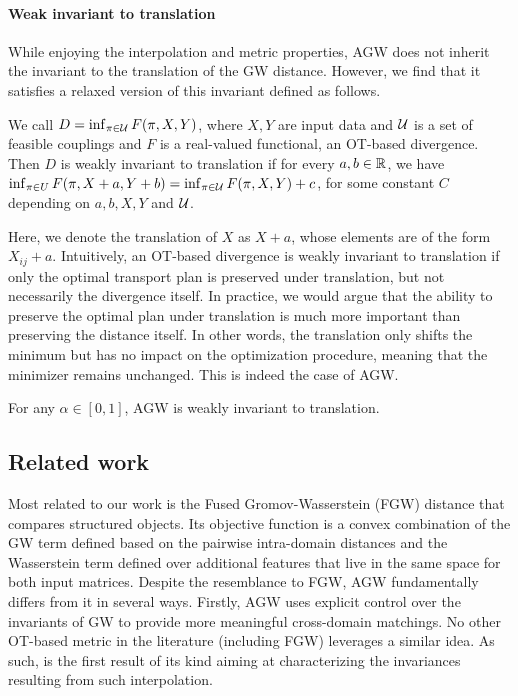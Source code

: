 \paragraph{Weak invariant to translation}
While enjoying the interpolation and metric properties, AGW does not inherit the invariant
to the translation of the GW distance. However, we find that it satisfies a relaxed version
of this invariant defined as follows.
\begin{definition}
    We call $D = \inf_{\pi \in \mathcal U} F(\pi, X, Y)$, where $X, Y$ are input data and $\mathcal U$
    is a set of feasible couplings and $F$ is a real-valued functional, an OT-based divergence.
    Then $D$ is weakly invariant to translation if for every $a, b \in \mathbb R$, we have
    $\inf_{\pi \in U} F(\pi, X + a, Y+b) = \inf_{\pi \in \mathcal U} F(\pi, X, Y) + c$,
    for some constant $C$ depending on $a, b, X, Y$ and $\mathcal U$.
\end{definition}
Here, we denote the translation of $X$ as $X + a$, whose elements are of the form $X_{ij} + a$.
Intuitively, an OT-based divergence is weakly invariant to translation if only
the optimal transport plan is preserved under translation, but not necessarily the divergence itself.
In practice, we would argue that the ability to preserve the optimal plan under translation
is much more important than preserving the distance itself. In other words,
the translation only shifts the minimum but has no impact on the optimization procedure,
meaning that the minimizer remains unchanged. This is indeed the case of AGW.
\begin{proposition}
    \label{prop:invariant} For any $\alpha \in [0,1]$, AGW is weakly invariant to translation.
\end{proposition}

\subsection{Related work}

Most related to our work is the Fused Gromov-Wasserstein (FGW) distance \citep{Vayer19b}
that compares structured objects. Its objective function is a convex combination of
the GW term defined based on the pairwise intra-domain distances and the Wasserstein term
defined over additional features that live in the same space for both input matrices.
Despite the resemblance to FGW, AGW fundamentally differs from it in several ways.
Firstly, AGW uses explicit control over the invariants of GW to provide more meaningful
cross-domain matchings. No other OT-based metric in the literature (including FGW)
leverages a similar idea. As such,  is the first result of its kind
aiming at characterizing the invariances resulting from such interpolation.


